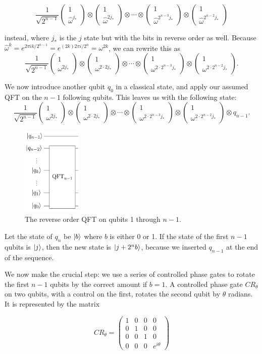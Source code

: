 \documentclass[11pt]{report}
\newcommand{\?}{\stackrel{?}{=}}
\newcommand{\qcol}[2]{\ensuremath{\begin{pmatrix} #1 \\ #2 \end{pmatrix}}}
\begin{document}
$$\frac{1}{\sqrt{2^{n-1}}} 
  \qcol{1}{\hat{\omega}^{j_*}}
  \otimes
  \qcol{1}{\hat{\omega}^{2j_*}}
  \otimes \cdots \otimes
  \qcol{1}{\hat{\omega}^{2^{n-3}j_*}}
  \otimes
  \qcol{1}{\hat{\omega}^{2^{n-2}j_*}}$$
  
instead, where $j_*$ is the $j$ state but with the bits in reverse order as well. Because $\hat{\omega}^{k} = e^{2\pi i k / 2^{n-1}} = e^{(2k) 2\pi i / 2^n} = \omega^{2k}$, we can rewrite this as
$$\frac{1}{\sqrt{2^{n-1}}} 
  \qcol{1}{\omega^{2j_*}}
  \otimes
  \qcol{1}{\omega^{2\cdot2j_*}}
  \otimes \cdots \otimes
  \qcol{1}{\omega^{2\cdot2^{n-3}j_*}}
  \otimes
  \qcol{1}{\omega^{2\cdot2^{n-2}j_*}}.$$
  
We now introduce another qubit $q_0$ in a classical state, and apply our assumed QFT on the $n-1$ following qubits. This leaves us with the following state:
$$\frac{1}{\sqrt{2^{n-1}}} 
  \qcol{1}{\omega^{2j_*}}
  \otimes
  \qcol{1}{\omega^{2\cdot2j_*}}
  \otimes \cdots \otimes
  \qcol{1}{\omega^{2\cdot2^{n-3}j_*}}
  \otimes
  \qcol{1}{\omega^{2\cdot2^{n-2}j_*}}
  \otimes q_{n-1}.$$
  
\begin{figure}[h]
\centering
\includegraphics[width=0.25\textwidth]{resources/images/qft1.png}
\caption{\label{fig:qft1}The reverse order QFT on qubits 1 through $n-1$.}
\end{figure}

Let the state of $q_n$ be $\Ket{b}$ where $b$ is either 0 or 1. If the state of the first $n-1$ qubits is $\Ket{j}$, then the new state is $\Ket{j + 2^nb}$, because we inserted $q_{n-1}$ at the end of the sequence.

We now make the crucial step: we use a series of controlled phase gates to rotate the first $n-1$ qubits by the correct amount if $b = 1$. A controlled phase gate $CR_\theta$ on two qubits, with a control on the first, rotates the second qubit by $\theta$ radians. It is represented by the matrix

$$CR_\theta = \begin{pmatrix}
1 & 0 & 0 & 0 \\
0 & 1 & 0 & 0 \\
0 & 0 & 1 & 0 \\
0 & 0 & 0 & e^{i\theta}
\end{pmatrix}$$
\end{document}
